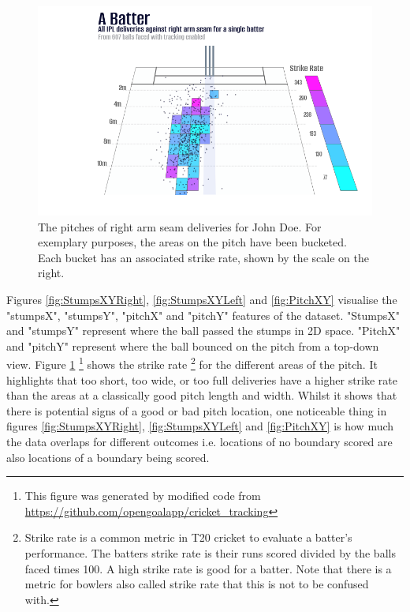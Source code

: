 \documentclass[12pt,a4paper]{report}
\theoremstyle{definition}
\begin{document}
\begin{figure}
    \centering
    \includegraphics[width=\linewidth]{right_arm_seam_pitch_strike_rate.png}
    \caption{The pitches of right arm seam deliveries for John Doe. For exemplary purposes, the areas on the pitch have been bucketed. Each bucket has an associated strike rate, shown by the scale on the right.}
    \label{fig:PitchXYStrikeRate}
\end{figure}

Figures \ref{fig:StumpsXYRight}, \ref{fig:StumpsXYLeft} and \ref{fig:PitchXY} visualise the "stumpsX", "stumpsY", "pitchX" and "pitchY" features of the dataset. 
"StumpsX" and "stumpsY" represent where the ball passed the stumps in 2D space.
"PitchX" and "pitchY" represent where the ball bounced on the pitch from a top-down view.
Figure \ref{fig:PitchXYStrikeRate} \footnote{This figure was generated by modified code from \url{https://github.com/opengoalapp/cricket\_tracking}} shows the strike rate \footnote{Strike rate is a common metric in T20 cricket to evaluate a batter's performance. The batters strike rate is their runs scored divided by the balls faced times 100. A high strike rate is good for a batter. Note that there is a metric for bowlers also called strike rate that this is not to be confused with.} for the different areas of the pitch. 
It highlights that too short, too wide, or too full deliveries have a higher strike rate than the areas at a classically good pitch length and width.
Whilst it shows that there is potential signs of a good or bad pitch location, one noticeable thing in figures \ref{fig:StumpsXYRight}, \ref{fig:StumpsXYLeft} and \ref{fig:PitchXY} is how much the data overlaps for different outcomes i.e. locations of no boundary scored are also locations of a boundary being scored.
\end{document}
